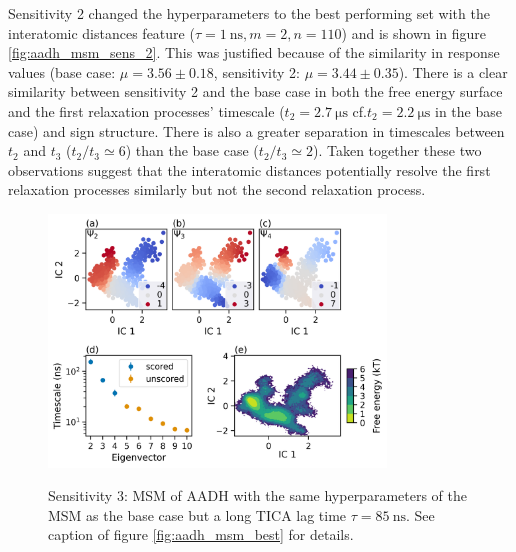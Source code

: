 Sensitivity 2 changed the hyperparameters to the best performing set with the interatomic distances feature ($\tau = \SI{1}{\nano\second}, m=2, n=110$) and is shown in figure \ref{fig:aadh_msm_sens_2}.  This was justified because of the similarity in response values (base case: $\mu=3.56 \pm 0.18$, sensitivity 2: $\mu=3.44 \pm 0.35$). There is a clear similarity between sensitivity 2 and the base case in both the free energy surface and the first relaxation processes' timescale ($t_{2} = \SI{2.7}{\micro\second}$ cf.$t_{2} = \SI{2.2}{\micro\second}$ in the base case) and sign structure.  There is also a greater separation in timescales between $t_{2}$ and $t_{3}$ ($t_{2}/t_{3} \simeq 6$) than the base case ($t_{2}/t_{3} \simeq 2$). Taken together these two observations suggest that the interatomic distances potentially resolve the first relaxation processes similarly but not the second relaxation process. 


\begin{figure}
    \centering
    \caption{Sensitivity 3: MSM of AADH with the same hyperparameters of the MSM as the base case but a long TICA lag time $\tau = \SI{85}{\nano\second}$.  See caption of figure \ref{fig:aadh_msm_best} for details.}
    \includegraphics[width=0.8\textwidth]{chapters/msm_optimization/figures/aadh_msm_sens_3.png}
    \label{fig:aadh_msm_sens_3}
\end{figure}

